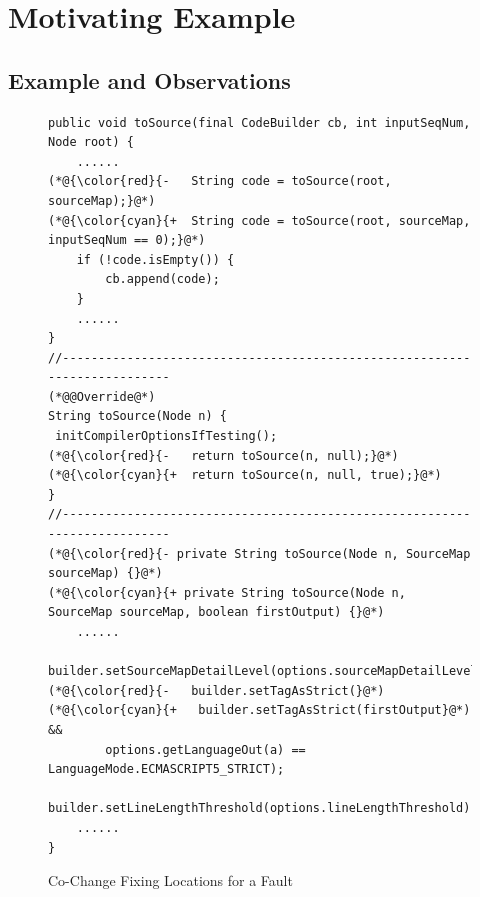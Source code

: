 \section{Motivating Example}
\label{motiv:section}

\subsection{Example and Observations}

\begin{figure}[t]
	\centering
	\begin{lstlisting}[]
public void toSource(final CodeBuilder cb, int inputSeqNum, Node root) {
	......
(*@{\color{red}{-	String code = toSource(root, sourceMap);}@*)
(*@{\color{cyan}{+	String code = toSource(root, sourceMap, inputSeqNum == 0);}@*)
	if (!code.isEmpty()) {
		cb.append(code);
	}
	......
}
//--------------------------------------------------------------------------
(*@@Override@*)
String toSource(Node n) {
 initCompilerOptionsIfTesting();
(*@{\color{red}{-	return toSource(n, null);}@*)
(*@{\color{cyan}{+ 	return toSource(n, null, true);}@*)
}
//--------------------------------------------------------------------------
(*@{\color{red}{- private String toSource(Node n, SourceMap sourceMap) {}@*)
(*@{\color{cyan}{+ private String toSource(Node n, SourceMap sourceMap, boolean firstOutput) {}@*)
	......
  builder.setSourceMapDetailLevel(options.sourceMapDetailLevel);
(*@{\color{red}{-   builder.setTagAsStrict(}@*)
(*@{\color{cyan}{+   builder.setTagAsStrict(firstOutput}@*) && 
		options.getLanguageOut(a) == LanguageMode.ECMASCRIPT5_STRICT);
  builder.setLineLengthThreshold(options.lineLengthThreshold);
	......	
}	
	\end{lstlisting}
        \vspace{-15pt}
        \caption{Co-Change Fixing Locations for a Fault}
        \vspace{-6pt}
        \label{fig:motiv}
\end{figure}

